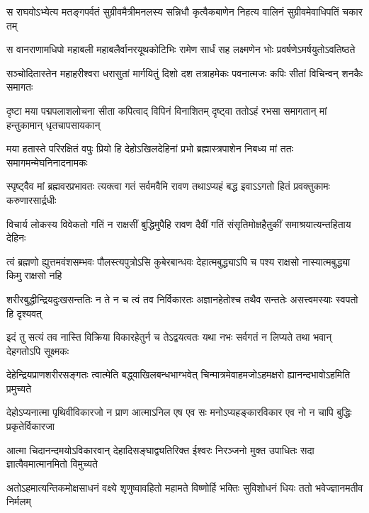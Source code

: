 \fourlineindentedshloka
{स राघवोऽभ्येत्य मतङ्गपर्वतं}
{सुग्रीवमैत्रीमनलस्य सन्निधौ}
{कृत्वैकबाणेन निहत्य वालिनं}
{सुग्रीवमेवाधिपतिं चकार तम्} %

\fourlineindentedshloka
{स वानराणामधिपो महाबली}
{महाबलैर्वानरयूथकोटिभिः}
{रामेण सार्धं सह लक्ष्मणेन भोः}
{प्रवर्षणेऽमर्षयुतोऽवतिष्ठते} %

\fourlineindentedshloka
{सञ्चोदितास्तेन महाहरीश्वरा}
{धरासुतां मार्गयितुं दिशो दश}
{तत्राहमेकः पवनात्मजः कपिः}
{सीतां विचिन्वन् शनकैः समागतः} %

\fourlineindentedshloka
{दृष्टा मया पद्मपलाशलोचना}
{सीता कपित्वाद् विपिनं विनाशितम्}
{दृष्ट्वा ततोऽहं रभसा समागतान्}
{मां हन्तुकामान् धृतचापसायकान्} %

\fourlineindentedshloka
{मया हतास्ते परिरक्षितं वपुः}
{प्रियो हि देहोऽखिलदेहिनां प्रभो}
{ब्रह्मास्त्रपाशेन निबध्य मां ततः}
{समागमन्मेघनिनादनामकः} %

\fourlineindentedshloka
{स्पृष्ट्वैव मां ब्रह्मवरप्रभावतः}
{त्यक्त्वा गतं सर्वमवैमि रावण}
{तथाऽप्यहं बद्ध इवाऽऽगतो हितं}
{प्रवक्तुकामः करुणारसार्द्रधीः} %

\fourlineindentedshloka
{विचार्य लोकस्य विवेकतो गतिं}
{न राक्षसीं बुद्धिमुपैहि रावण}
{दैवीं गतिं संसृतिमोक्षहैतुकीं}
{समाश्रयात्यन्तहिताय देहिनः} %

\fourlineindentedshloka
{त्वं ब्रह्मणो ह्युत्तमवंशसम्भवः}
{पौलस्त्यपुत्रोऽसि कुबेरबान्धवः}
{देहात्मबुद्ध्याऽपि च पश्य राक्षसो}
{नास्यात्मबुद्ध्या किमु राक्षसो नहि} %

\fourlineindentedshloka
{शरीरबुद्धीन्द्रियदुःखसन्ततिः}
{न ते न च त्वं तव निर्विकारतः}
{अज्ञानहेतोश्च तथैव सन्ततेः}
{असत्त्वमस्याः स्वपतो हि दृश्यवत्} %

\fourlineindentedshloka
{इदं तु सत्यं तव नास्ति विक्रिया}
{विकारहेतुर्न च तेऽद्वयत्वतः}
{यथा नभः सर्वगतं न लिप्यते}
{तथा भवान् देहगतोऽपि सूक्ष्मकः}

\fourlineindentedshloka
{देहेन्द्रियप्राणशरीरसङ्गतः}
{त्वात्मेति बद्\mbox{}ध्वाखिलबन्धभाग्भवेत्} %
{चिन्मात्रमेवाहमजोऽहमक्षरो}
{ह्यानन्दभावोऽहमिति प्रमुच्यते}

\fourlineindentedshloka
{देहोऽप्यनात्मा पृथिवीविकारजो}
{न प्राण आत्माऽनिल एष एव सः} %
{मनोऽप्यहङ्कारविकार एव नो}
{न चापि बुद्धिः प्रकृतेर्विकारजा}

\fourlineindentedshloka
{आत्मा चिदानन्दमयोऽविकारवान्}
{देहादिसङ्घाद्व्यतिरिक्त ईश्वरः} %
{निरञ्जनो मुक्त उपाधितः सदा}
{ज्ञात्वैवमात्मानमितो विमुच्यते}

\fourlineindentedshloka
{अतोऽहमात्यन्तिकमोक्षसाधनं}
{वक्ष्ये शृणुष्वावहितो महामते} %
{विष्णोर्हि भक्तिः सुविशोधनं धियः}
{ततो भवेज्ज्ञानमतीव निर्मलम्}

